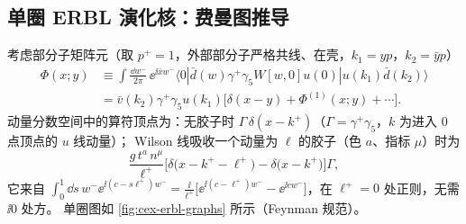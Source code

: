 \subsection{单圈 ERBL 演化核：费曼图推导}\label{sec:cex-erbl-derivation}

考虑部分子矩阵元（取 $p^+=1$，外部部分子严格共线、在壳，$k_1=yp$，$k_2=\bar yp$）
\begin{equation}
\begin{split}
\Phi(x;y)&\equiv\int\frac{\dd w^-}{2\pi}\,\ee^{\ii\bar xw^-}\langle0|\bar d(w)\gamma^+\gamma_5W[w,0]u(0)|u(k_1)\bar d(k_2)\rangle\\
&=\bar v(k_2)\gamma^+\gamma_5u(k_1)\big[\delta(x-y)+\Phi^{(1)}(x;y)+\cdots\big].
\end{split}
\end{equation}
动量分数空间中的算符顶点为：无胶子时 $\Gamma\,\delta(x-k^+)$（$\Gamma=\gamma^+\gamma_5$，$k$ 为进入 $0$ 点顶点的 $u$ 线动量）；
Wilson 线吸收一个动量为 $\ell$ 的胶子（色 $a$、指标 $\mu$）时为
\begin{equation}\label{eq:cex-wilson-vertex}
\frac{g\,t^a\,n^\mu}{\ell^+}\Big[\delta\big(x-k^+-\ell^+\big)-\delta\big(x-k^+\big)\Big]\Gamma,
\end{equation}
它来自 $\int_0^1\dd s\,w^-\ee^{\ii(c-s\ell^+)w^-}=\frac{\ii}{\ell^+}\big[\ee^{\ii(c-\ell^+)w^-}-\ee^{\ii cw^-}\big]$，在 $\ell^+=0$ 处正则，无需 $\ii0$ 处方。
单圈图如 \cref{fig:cex-erbl-graphs} 所示（Feynman 规范）。

